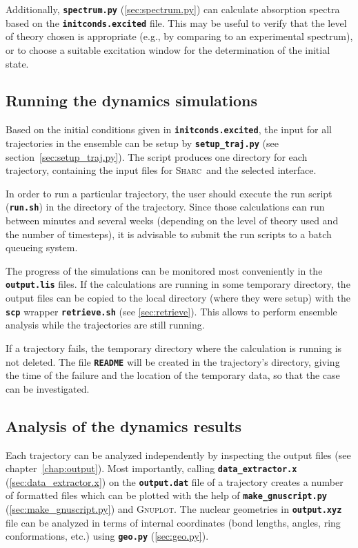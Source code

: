 \documentclass[a4paper,11pt,DIV=15,openany,twoside=false]{scrbook}
\newcommand{\sharc}{\textsc{Sharc}}
\newcommand{\ttt}[1]{\textbf{\texttt{#1}}}
\begin{document}
Additionally, \ttt{spectrum.py} (\ref{sec:spectrum.py}) can calculate absorption spectra based on the \ttt{initconds.excited} file. This may be useful to verify that the level of theory chosen is appropriate (e.g., by comparing to an experimental spectrum), or to choose a suitable excitation window for the determination of the initial state.

\subsection{Running the dynamics simulations}

Based on the initial conditions given in \ttt{initconds.excited}, the input for all trajectories in the ensemble can be setup by \ttt{setup\_traj.py} (see section~\ref{sec:setup_traj.py}). The script produces one directory for each trajectory, containing the input files for \sharc\ and the selected interface.

In order to run a particular trajectory, the user should execute the run script (\ttt{run.sh}) in the directory of the trajectory. Since those calculations can run between minutes and several weeks (depending on the level of theory used and the number of timesteps), it is advisable to submit the run scripts to a batch queueing system. 

The progress of the simulations can be monitored most conveniently in the \ttt{output.lis} files. If the calculations are running in some temporary directory, the output files can be copied to the local directory (where they were setup) with the \ttt{scp} wrapper \ttt{retrieve.sh} (see \ref{sec:retrieve}). This allows to perform ensemble analysis while the trajectories are still running.

If a trajectory fails, the temporary directory where the calculation is running is not deleted. The file \ttt{README} will be created in the trajectory's directory, giving the time of the failure and the location of the temporary data, so that the case can be investigated. 

\subsection{Analysis of the dynamics results}

Each trajectory can be analyzed independently by inspecting the output files (see chapter~\ref{chap:output}). Most importantly, calling \ttt{data\_extractor.x} (\ref{sec:data_extractor.x}) on the \ttt{output.dat} file of a trajectory creates a number of formatted files which can be plotted with the help of \ttt{make\_gnuscript.py} (\ref{sec:make_gnuscript.py}) and \textsc{Gnuplot}.
The nuclear geometries in \ttt{output.xyz} file can be analyzed in terms of internal coordinates (bond lengths, angles, ring conformations, etc.) using \ttt{geo.py} (\ref{sec:geo.py}).
\end{document}

